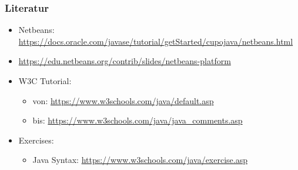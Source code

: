 \documentclass{beamer}
\begin{document}
	\begin{frame}
		\frametitle{Literatur}
		\begin{itemize}
			\item Netbeans: \url{https://docs.oracle.com/javase/tutorial/getStarted/cupojava/netbeans.html}
			\item \url{https://edu.netbeans.org/contrib/slides/netbeans-platform}
			\item W3C Tutorial: 
			\begin{itemize}
				\item von: \url{https://www.w3schools.com/java/default.asp}
				\item bis: \url{https://www.w3schools.com/java/java\_comments.asp}
			\end{itemize}
			\item Exercises:
			\begin{itemize}
				\item Java Syntax: \url{https://www.w3schools.com/java/exercise.asp}
			\end{itemize}
		\end{itemize}
	\end{frame}
\end{document}
